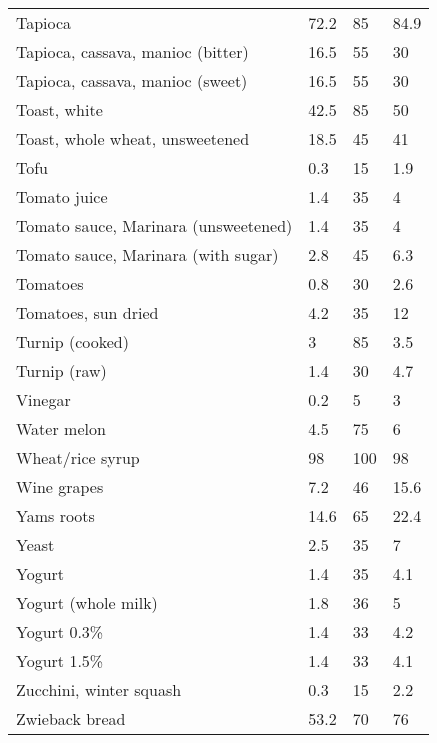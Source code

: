 \documentclass[../main.tex]{subfiles}
\begin{document}
\begin{longtable}{llll}
Tapioca & 72.2 & 85 & 84.9 \\
Tapioca, cassava, manioc (bitter) & 16.5 & 55 & 30 \\
Tapioca, cassava, manioc (sweet) & 16.5 & 55 & 30 \\
Toast, white & 42.5 & 85 & 50 \\
Toast, whole wheat, unsweetened & 18.5 & 45 & 41 \\
Tofu & 0.3 & 15 & 1.9 \\
Tomato juice & 1.4 & 35 & 4 \\
Tomato sauce, Marinara (unsweetened) & 1.4 & 35 & 4 \\
Tomato sauce, Marinara (with sugar) & 2.8 & 45 & 6.3 \\
Tomatoes & 0.8 & 30 & 2.6 \\
Tomatoes, sun dried & 4.2 & 35 & 12 \\
Turnip (cooked) & 3 & 85 & 3.5 \\
Turnip (raw) & 1.4 & 30 & 4.7 \\
Vinegar & 0.2 & 5 & 3 \\
Water melon & 4.5 & 75 & 6 \\
Wheat/rice syrup & 98 & 100 & 98 \\
Wine grapes & 7.2 & 46 & 15.6 \\
Yams roots & 14.6 & 65 & 22.4 \\
Yeast & 2.5 & 35 & 7 \\
Yogurt & 1.4 & 35 & 4.1 \\
Yogurt (whole milk) & 1.8 & 36 & 5 \\
Yogurt 0.3\% & 1.4 & 33 & 4.2 \\
Yogurt 1.5\% & 1.4 & 33 & 4.1 \\
Zucchini, winter squash & 0.3 & 15 & 2.2 \\
Zwieback bread & 53.2 & 70 & 76 \\

\end{longtable}
\end{document}
